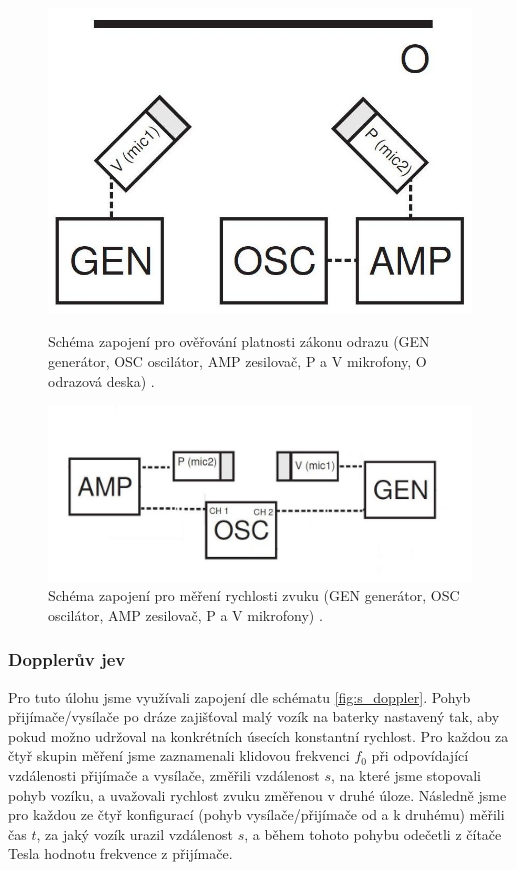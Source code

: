 \documentclass[english]{article}
\begin{document}
	\begin{figure}
	\centering
	\begin{minipage}{.45\textwidth}
	  \centering
	  \includegraphics[width=.53\linewidth]{att/s_zakon.jpg}
	  \caption{Schéma zapojení pro ověřování platnosti zákonu odrazu (GEN generátor, OSC oscilátor, AMP zesilovač, P a V mikrofony, O odrazová deska) \cite{bib:zadani}.}
	  \label{fig:s_zakon_odrazu}
	\end{minipage}%
	\hfill
	\begin{minipage}{.45\textwidth}
	  \centering
	  \includegraphics[width=.9\linewidth]{att/s_rychlost.jpg}
	  \caption{Schéma zapojení pro měření rychlosti zvuku (GEN generátor, OSC oscilátor, AMP zesilovač, P a V mikrofony) \cite{bib:repo}.}
	  \label{fig:s_rychlost_zvuku}
	\end{minipage}
	\end{figure}

	\subsubsection{Dopplerův jev}
		Pro tuto úlohu jsme využívali zapojení dle schématu \ref{fig:s_doppler}. Pohyb přijímače/vysílače po dráze zajišťoval malý vozík na baterky nastavený tak, aby pokud možno udržoval na konkrétních úsecích konstantní rychlost. Pro každou za čtyř skupin měření jsme zaznamenali klidovou frekvenci $f_0$ při odpovídající vzdálenosti přijímače a vysílače, změřili vzdálenost $s$, na které jsme stopovali pohyb vozíku, a uvažovali rychlost zvuku změřenou v druhé úloze. Následně jsme pro každou ze čtyř konfigurací (pohyb vysílače/přijímače od a k druhému) měřili čas $t$, za jaký vozík urazil vzdálenost $s$, a během tohoto pohybu odečetli z čítače Tesla hodnotu frekvence z přijímače. 
\end{document}

